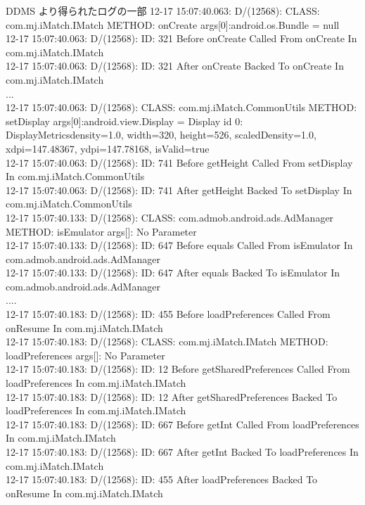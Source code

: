\begin{itembox}[c]{DDMS より得られたログの一部}
\footnotesize{
12-17 15:07:40.063: D/(12568): CLASS: com.mj.iMatch.IMatch METHOD: onCreate args[0]:android.os.Bundle = null\\
12-17 15:07:40.063: D/(12568): ID: 321 Before onCreate Called From onCreate In com.mj.iMatch.IMatch\\
12-17 15:07:40.063: D/(12568): ID: 321 After onCreate Backed To onCreate In com.mj.iMatch.IMatch\\
...\\
12-17 15:07:40.063: D/(12568): CLASS: com.mj.iMatch.CommonUtils METHOD: setDisplay args[0]:android.view.Display = Display id 0: DisplayMetrics{density=1.0, width=320, height=526, scaledDensity=1.0, xdpi=147.48367, ydpi=147.78168}, isValid=true\\
12-17 15:07:40.063: D/(12568): ID: 741 Before getHeight Called From setDisplay In com.mj.iMatch.CommonUtils\\
12-17 15:07:40.063: D/(12568): ID: 741 After getHeight Backed To  setDisplay In com.mj.iMatch.CommonUtils\\
12-17 15:07:40.133: D/(12568): CLASS: com.admob.android.ads.AdManager METHOD: isEmulator args[]: No Parameter\\
12-17 15:07:40.133: D/(12568): ID: 647 Before equals Called From isEmulator In com.admob.android.ads.AdManager\\
12-17 15:07:40.133: D/(12568): ID: 647 After equals Backed To  isEmulator In com.admob.android.ads.AdManager\\
....\\
12-17 15:07:40.183: D/(12568): ID: 455 Before loadPreferences Called From onResume In com.mj.iMatch.IMatch\\
12-17 15:07:40.183: D/(12568): CLASS: com.mj.iMatch.IMatch METHOD: loadPreferences args[]: No Parameter\\
12-17 15:07:40.183: D/(12568): ID: 12 Before getSharedPreferences Called From loadPreferences In com.mj.iMatch.IMatch\\
12-17 15:07:40.183: D/(12568): ID: 12 After getSharedPreferences Backed To  loadPreferences In com.mj.iMatch.IMatch\\
12-17 15:07:40.183: D/(12568): ID: 667 Before getInt Called From loadPreferences In com.mj.iMatch.IMatch\\
12-17 15:07:40.183: D/(12568): ID: 667 After getInt Backed To  loadPreferences In com.mj.iMatch.IMatch\\
12-17 15:07:40.183: D/(12568): ID: 455 After loadPreferences Backed To  onResume In com.mj.iMatch.IMatch\\
}
\end{itembox}


